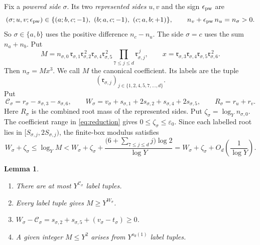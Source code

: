 \documentclass{amsart}
\newtheorem{lemma}{Lemma}[section]
\theoremstyle{definition}
\theoremstyle{plain}
\numberwithin{equation}{section}
\numberwithin{table}{section}
\begin{document}
Fix a \emph{powered side} $\sigma$. Its two \emph{represented sides} $u,v$ and
the sign $\epsilon_{\rm pw}$ are
\begin{equation}\label{eq:pw:orient}
 (\sigma;u,v;\epsilon_{\rm pw})\in\{(a;b,c;-1),\ (b;a,c;-1),\ (c;a,b;+1)\},
 \qquad n_v+\epsilon_{\rm pw}\,n_u=n_\sigma>0 .
\end{equation}
So $\sigma\in\{a,b\}$ uses the positive difference $n_c-n_u$. The side
$\sigma=c$ uses the sum $n_a+n_b$. Put
\begin{equation}\label{eq:pw:Mx}
 M=n_{\sigma,0}\,\mathfrak r_{\sigma,1}\mathfrak r_{\sigma,2}^{\,2}
   \mathfrak r_{\sigma,4}\mathfrak r_{\sigma,5}^{\,2}
   \prod_{7\le j\le d}\mathfrak r_{\sigma,j}^{\,j},
 \qquad
 x=\mathfrak r_{\sigma,3}\mathfrak r_{\sigma,4}\mathfrak r_{\sigma,5}
   \mathfrak r_{\sigma,6}^{\,2}.
\end{equation}
Then $n_\sigma=Mx^3$. We call $M$ the canonical coefficient. Its labels are
the tuple
\[
 (\mathfrak r_{\sigma,j})_{j\in\{1,2,4,5,7,\dots,d\}}.
\]
Put
\begin{equation}\label{eq:pw:CWR}
 \mathcal C_\sigma=r_\sigma-s_{\sigma,3}-s_{\sigma,6},\qquad
 W_\sigma=v_\sigma+s_{\sigma,1}+2s_{\sigma,2}+s_{\sigma,4}+2s_{\sigma,5},\qquad
 R_\sigma=r_u+r_v .
\end{equation}
Here $R_\sigma$ is the combined root mass of the represented sides.
Put $\zeta_\sigma=\log_Y n_{\sigma,0}$. The coefficient range in
\eqref{eq:reduction} gives $0\le\zeta_\sigma\le\varepsilon_0$. Since each
labelled root lies in $[S_{\sigma,j},2S_{\sigma,j})$, the finite-box modulus
satisfies
\begin{equation}\label{eq:pw:Mscale}
 W_\sigma+\zeta_\sigma\le\log_Y M
 <W_\sigma+\zeta_\sigma+
 \frac{\bigl(6+\sum_{7\le j\le d}j\bigr)\log2}{\log Y}
 =W_\sigma+\zeta_\sigma+O_d\!\left(\frac1{\log Y}\right).
\end{equation}

\begin{lemma}\label{lem:pw:ledger}
\begin{enumerate}
\item[(i)] There are at most $Y^{\mathcal C_\sigma}$ label tuples.
\item[(ii)] Every label tuple gives $M\ge Y^{W_\sigma}$.
\item[(iii)] $W_\sigma-\mathcal C_\sigma=s_{\sigma,2}+s_{\sigma,5}+(v_\sigma-t_\sigma)\ge0$.
\item[(iv)] A given integer $M\le Y^2$ arises from $Y^{o_d(1)}$ label tuples.
\end{enumerate}
\end{lemma}
\end{document}
